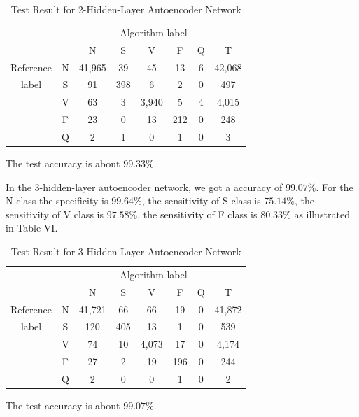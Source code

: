 \documentclass{bmcart}
\begin{document}
\begin{table}[!htbp]
\begin{center}
\begin{threeparttable}
\caption{Test Result for 2-Hidden-Layer Autoencoder Network}
\label{table6}
\begin{tabular}{cccccccc}
\hline
\multicolumn{6}{r}{Algorithm label} \\
\cline{3-7}
			&   & N      & S    & V     & F   & Q   & T\\
\hline
 Reference  & N & 41,965 & 39   &  45   & 13  &  6  &  42,068 \\
	label   & S &  91    & 398  &  6    & 2   & 0   &  497\\
			& V &  63    & 3    & 3,940 & 5   & 4   &  4,015\\
			& F &  23    & 0    & 13    & 212 & 0   &  248\\
			& Q &  2     & 1    & 0      & 1   & 0   &  3\\
\hline
\end{tabular}
\begin{tablenotes}
\item The test accuracy is about $99.33\%$.
\end{tablenotes}
\end{threeparttable}
\end{center}
\end{table}

In the 3-hidden-layer autoencoder network, we got a accuracy of $99.07\%$. For the N class the specificity is $99.64\%$, the sensitivity of S class is $75.14\%$, the sensitivity of V class is $97.58\%$, the sensitivity of F class is $80.33\%$ as illustrated in Table VI.

\begin{table}[!htbp]
\begin{center}
\begin{threeparttable}
\caption{Test Result for 3-Hidden-Layer Autoencoder Network}
\label{table6}
\begin{tabular}{cccccccc}
\hline
\multicolumn{6}{r}{Algorithm label} \\
\cline{3-7}
			&   & N      & S    & V     & F   & Q  & T\\
\hline
 Reference  & N & 41,721 &  66  &  66   & 19  &  0 &  41,872 \\
	label   & S &  120   & 405  &  13   & 1   & 0  &  539\\
			& V &  74    & 10   & 4,073 & 17  & 0  &  4,174\\
			& F &  27    & 2    & 19    & 196 & 0  &  244\\
			& Q &  2     & 0    & 0     & 1   & 0  &  2\\
\hline
\end{tabular}
\begin{tablenotes}
\item The test accuracy is about $99.07\%$.
\end{tablenotes}
\end{threeparttable}
\end{center}
\end{table}
\end{document}
